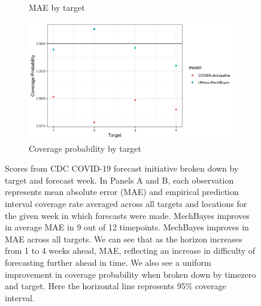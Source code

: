 \documentclass[11pt]{amsart}
\begin{document}
\begin{figure}
\begin{subfigure}{.5\textwidth}
    \caption{MAE by target}
\end{subfigure}%
\begin{subfigure}{.5\textwidth}
  \centering
    \includegraphics[scale=.115]{cp_results_by_target.png}
    \caption{Coverage probability by target}
\end{subfigure}%

\caption{Scores from CDC COVID-19 forecast initiative broken down by target and forecast week. In Panels A and B, each observation represents mean absolute error (MAE) and empirical prediction interval coverage rate averaged across all targets and locations for the given week in which forecasts were made. MechBayes improves in average MAE in 9 out of 12 timepoints. MechBayes improves in MAE across all targets. We can see that as the horizon increases from 1 to 4 weeks ahead, MAE, reflecting an increase in difficulty of forecasting further ahead in time. We also see a uniform improvement in coverage probability when broken down by timezero and target. Here the horizontal line represents 95\% coverage interval. }
\label{fig:covidhub}
\end{figure}
\end{document}

